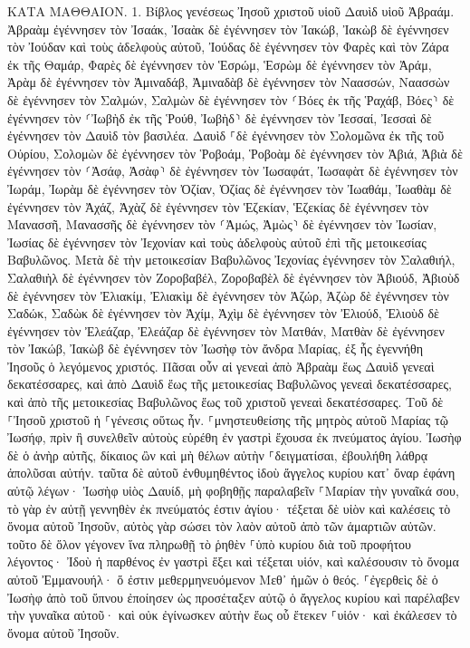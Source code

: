 \documentclass[twoside, 9pt]{extreport}
\begin{document}
ΚΑΤΑ ΜΑΘΘΑΙΟΝ.
1.
Βίβλος γενέσεως Ἰησοῦ χριστοῦ υἱοῦ Δαυὶδ υἱοῦ Ἀβραάμ. 
Ἀβραὰμ ἐγέννησεν τὸν Ἰσαάκ, Ἰσαὰκ δὲ ἐγέννησεν τὸν Ἰακώβ, Ἰακὼβ δὲ ἐγέννησεν τὸν Ἰούδαν καὶ τοὺς ἀδελφοὺς αὐτοῦ, 
Ἰούδας δὲ ἐγέννησεν τὸν Φαρὲς καὶ τὸν Ζάρα ἐκ τῆς Θαμάρ, Φαρὲς δὲ ἐγέννησεν τὸν Ἑσρώμ, Ἑσρὼμ δὲ ἐγέννησεν τὸν Ἀράμ, 
Ἀρὰμ δὲ ἐγέννησεν τὸν Ἀμιναδάβ, Ἀμιναδὰβ δὲ ἐγέννησεν τὸν Ναασσών, Ναασσὼν δὲ ἐγέννησεν τὸν Σαλμών, 
Σαλμὼν δὲ ἐγέννησεν τὸν ⸂Βόες ἐκ τῆς Ῥαχάβ, Βόες⸃ δὲ ἐγέννησεν τὸν ⸂Ἰωβὴδ ἐκ τῆς Ῥούθ, Ἰωβὴδ⸃ δὲ ἐγέννησεν τὸν Ἰεσσαί, 
Ἰεσσαὶ δὲ ἐγέννησεν τὸν Δαυὶδ τὸν βασιλέα. Δαυὶδ ⸀δὲ ἐγέννησεν τὸν Σολομῶνα ἐκ τῆς τοῦ Οὐρίου, 
Σολομὼν δὲ ἐγέννησεν τὸν Ῥοβοάμ, Ῥοβοὰμ δὲ ἐγέννησεν τὸν Ἀβιά, Ἀβιὰ δὲ ἐγέννησεν τὸν ⸂Ἀσάφ, 
Ἀσὰφ⸃ δὲ ἐγέννησεν τὸν Ἰωσαφάτ, Ἰωσαφὰτ δὲ ἐγέννησεν τὸν Ἰωράμ, Ἰωρὰμ δὲ ἐγέννησεν τὸν Ὀζίαν, 
Ὀζίας δὲ ἐγέννησεν τὸν Ἰωαθάμ, Ἰωαθὰμ δὲ ἐγέννησεν τὸν Ἀχάζ, Ἀχὰζ δὲ ἐγέννησεν τὸν Ἑζεκίαν, 
Ἑζεκίας δὲ ἐγέννησεν τὸν Μανασσῆ, Μανασσῆς δὲ ἐγέννησεν τὸν ⸂Ἀμώς, Ἀμὼς⸃ δὲ ἐγέννησεν τὸν Ἰωσίαν, 
Ἰωσίας δὲ ἐγέννησεν τὸν Ἰεχονίαν καὶ τοὺς ἀδελφοὺς αὐτοῦ ἐπὶ τῆς μετοικεσίας Βαβυλῶνος. 
Μετὰ δὲ τὴν μετοικεσίαν Βαβυλῶνος Ἰεχονίας ἐγέννησεν τὸν Σαλαθιήλ, Σαλαθιὴλ δὲ ἐγέννησεν τὸν Ζοροβαβέλ, 
Ζοροβαβὲλ δὲ ἐγέννησεν τὸν Ἀβιούδ, Ἀβιοὺδ δὲ ἐγέννησεν τὸν Ἐλιακίμ, Ἐλιακὶμ δὲ ἐγέννησεν τὸν Ἀζώρ, 
Ἀζὼρ δὲ ἐγέννησεν τὸν Σαδώκ, Σαδὼκ δὲ ἐγέννησεν τὸν Ἀχίμ, Ἀχὶμ δὲ ἐγέννησεν τὸν Ἐλιούδ, 
Ἐλιοὺδ δὲ ἐγέννησεν τὸν Ἐλεάζαρ, Ἐλεάζαρ δὲ ἐγέννησεν τὸν Ματθάν, Ματθὰν δὲ ἐγέννησεν τὸν Ἰακώβ, 
Ἰακὼβ δὲ ἐγέννησεν τὸν Ἰωσὴφ τὸν ἄνδρα Μαρίας, ἐξ ἧς ἐγεννήθη Ἰησοῦς ὁ λεγόμενος χριστός. 
Πᾶσαι οὖν αἱ γενεαὶ ἀπὸ Ἀβραὰμ ἕως Δαυὶδ γενεαὶ δεκατέσσαρες, καὶ ἀπὸ Δαυὶδ ἕως τῆς μετοικεσίας Βαβυλῶνος γενεαὶ δεκατέσσαρες, καὶ ἀπὸ τῆς μετοικεσίας Βαβυλῶνος ἕως τοῦ χριστοῦ γενεαὶ δεκατέσσαρες. 
Τοῦ δὲ ⸀Ἰησοῦ χριστοῦ ἡ ⸀γένεσις οὕτως ἦν. ⸀μνηστευθείσης τῆς μητρὸς αὐτοῦ Μαρίας τῷ Ἰωσήφ, πρὶν ἢ συνελθεῖν αὐτοὺς εὑρέθη ἐν γαστρὶ ἔχουσα ἐκ πνεύματος ἁγίου. 
Ἰωσὴφ δὲ ὁ ἀνὴρ αὐτῆς, δίκαιος ὢν καὶ μὴ θέλων αὐτὴν ⸀δειγματίσαι, ἐβουλήθη λάθρᾳ ἀπολῦσαι αὐτήν. 
ταῦτα δὲ αὐτοῦ ἐνθυμηθέντος ἰδοὺ ἄγγελος κυρίου κατ᾽ ὄναρ ἐφάνη αὐτῷ λέγων· Ἰωσὴφ υἱὸς Δαυίδ, μὴ φοβηθῇς παραλαβεῖν ⸀Μαρίαν τὴν γυναῖκά σου, τὸ γὰρ ἐν αὐτῇ γεννηθὲν ἐκ πνεύματός ἐστιν ἁγίου· 
τέξεται δὲ υἱὸν καὶ καλέσεις τὸ ὄνομα αὐτοῦ Ἰησοῦν, αὐτὸς γὰρ σώσει τὸν λαὸν αὐτοῦ ἀπὸ τῶν ἁμαρτιῶν αὐτῶν. 
τοῦτο δὲ ὅλον γέγονεν ἵνα πληρωθῇ τὸ ῥηθὲν ⸀ὑπὸ κυρίου διὰ τοῦ προφήτου λέγοντος· 
Ἰδοὺ ἡ παρθένος ἐν γαστρὶ ἕξει καὶ τέξεται υἱόν, καὶ καλέσουσιν τὸ ὄνομα αὐτοῦ Ἐμμανουήλ· ὅ ἐστιν μεθερμηνευόμενον Μεθ᾽ ἡμῶν ὁ θεός. 
⸀ἐγερθεὶς δὲ ὁ Ἰωσὴφ ἀπὸ τοῦ ὕπνου ἐποίησεν ὡς προσέταξεν αὐτῷ ὁ ἄγγελος κυρίου καὶ παρέλαβεν τὴν γυναῖκα αὐτοῦ· 
καὶ οὐκ ἐγίνωσκεν αὐτὴν ἕως οὗ ἔτεκεν ⸀υἱόν· καὶ ἐκάλεσεν τὸ ὄνομα αὐτοῦ Ἰησοῦν. 
\end{document}
